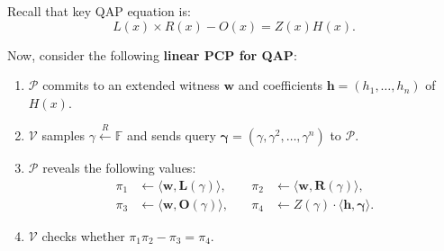 \documentclass{zkdl-presentation-template}
\begin{document}
    \begin{frame}
        \begin{example}
            Recall that key QAP equation is:
            \begin{equation*}
                L(x) \times R(x) - O(x) = Z(x)H(x).
            \end{equation*}
            
            Now, consider the following \textbf{linear PCP for QAP}:
            \begin{enumerate}
                \item $\mathcal{P}$ commits to an extended witness $\boldsymbol{w}$ and coefficients $\boldsymbol{h} = (h_1,\dots,h_n)$ of $H(x)$.
                \item $\mathcal{V}$ samples $\gamma \xleftarrow{R} \mathbb{F}$ and sends query $\boldsymbol{\gamma} = (\gamma,\gamma^2,\dots,\gamma^n)$ to $\mathcal{P}$.
                \item $\mathcal{P}$ reveals the following values:
                \begin{align*}
                    \pi_1 &\gets \langle \boldsymbol{w}, \boldsymbol{L}(\gamma) \rangle, \quad &\pi_2 &\gets \langle \boldsymbol{w}, \boldsymbol{R}(\gamma) \rangle, \\ 
                    \pi_3 &\gets \langle \boldsymbol{w}, \boldsymbol{O}(\gamma) \rangle, \quad &\pi_4 &\gets Z(\gamma) \cdot \langle \boldsymbol{h}, \boldsymbol{\gamma} \rangle.
                \end{align*}
                \item $\mathcal{V}$ checks whether $\pi_1\pi_2 - \pi_3 = \pi_4$.
            \end{enumerate}
        \end{example}
    \end{frame}
\end{document}
